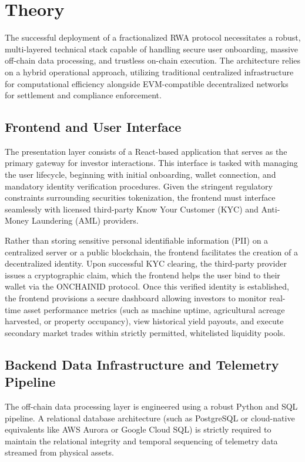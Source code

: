 \documentclass{Resources/bdlt-project}
\begin{document}
\section{Theory}
The successful deployment of a fractionalized RWA protocol necessitates a robust, multi-layered technical stack capable of handling secure user onboarding, massive off-chain data processing, and trustless on-chain execution. The architecture relies on a hybrid operational approach, utilizing traditional centralized infrastructure for computational efficiency alongside EVM-compatible decentralized networks for settlement and compliance enforcement.

\subsection{Frontend and User Interface}
The presentation layer consists of a React-based application that serves as the primary gateway for investor interactions. This interface is tasked with managing the user lifecycle, beginning with initial onboarding, wallet connection, and mandatory identity verification procedures. Given the stringent regulatory constraints surrounding securities tokenization, the frontend must interface seamlessly with licensed third-party Know Your Customer (KYC) and Anti-Money Laundering (AML) providers.

Rather than storing sensitive personal identifiable information (PII) on a centralized server or a public blockchain, the frontend facilitates the creation of a decentralized identity. Upon successful KYC clearing, the third-party provider issues a cryptographic claim, which the frontend helps the user bind to their wallet via the ONCHAINID protocol. Once this verified identity is established, the frontend provisions a secure dashboard allowing investors to monitor real-time asset performance metrics (such as machine uptime, agricultural acreage harvested, or property occupancy), view historical yield payouts, and execute secondary market trades within strictly permitted, whitelisted liquidity pools.

\subsection{Backend Data Infrastructure and Telemetry Pipeline}
The off-chain data processing layer is engineered using a robust Python and SQL pipeline. A relational database architecture (such as PostgreSQL or cloud-native equivalents like AWS Aurora or Google Cloud SQL) is strictly required to maintain the relational integrity and temporal sequencing of telemetry data streamed from physical assets.
\end{document}
